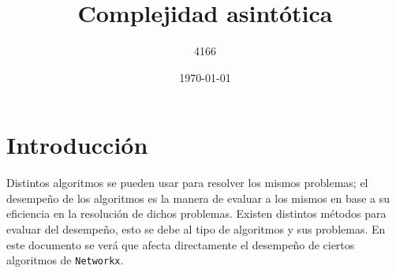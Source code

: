 \documentclass{article}
\title{Complejidad asintótica}
\author{4166}
\date{\today}
\begin{document}
\maketitle
\section*{Introducción}
Distintos algoritmos se pueden usar para resolver los mismos problemas; el desempeño de los algoritmos es la manera de evaluar a los mismos en base a su eficiencia en la resolución de dichos problemas. Existen distintos métodos para evaluar del desempeño, esto se debe al tipo de algoritmos y sus problemas. En este documento se verá que afecta directamente el desempeño de ciertos algoritmos de \texttt{Networkx}.
\end{document}
